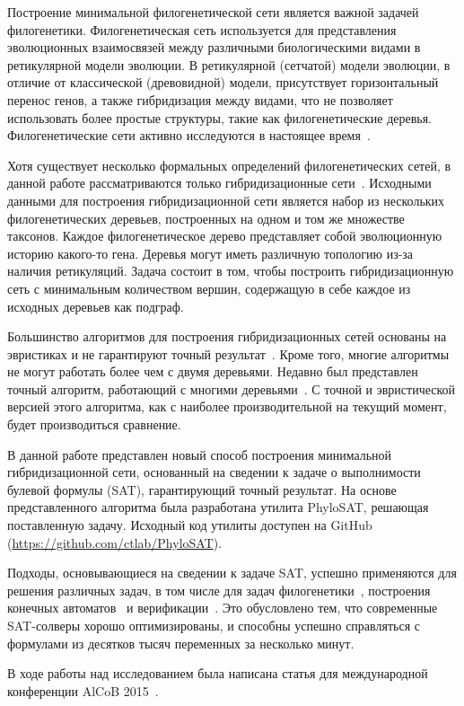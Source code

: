 \startprefacepage

Построение минимальной филогенетической сети является важной задачей филогенетики.
Филогенетическая сеть используется для представления эволюционных взаимосвязей между различными биологическими видами в ретикулярной модели эволюции.
В ретикулярной (сетчатой) модели эволюции, в отличие от классической (древовидной) модели, присутствует горизонтальный перенос генов, а также гибридизация между видами, что не позволяет использовать более простые структуры, такие как филогенетические деревья.
Филогенетические сети активно исследуются в настоящее время~\cite{huson2010phylogenetic, morrison2011introduction, 
nakhleh2011evolutionary}.

Хотя существует несколько формальных определений филогенетических сетей, в данной работе рассматриваются только гибридизационные сети~\cite{semple2006hybridization, chen2010hybridnet}.
Исходными данными для построения гибридизационной сети является набор из нескольких филогенетических деревьев, построенных на одном и том же множестве таксонов.
Каждое филогенетическое дерево представляет собой эволюционную историю какого-то гена.
Деревья могут иметь различную топологию из-за наличия ретикуляций.
Задача состоит в том, чтобы построить гибридизационную сеть с минимальным количеством вершин, содержащую в себе каждое из исходных деревьев как подграф.

Большинство алгоритмов для построения гибридизационных сетей основаны на эвристиках и не гарантируют точный результат~\cite{wu2010close, park2012murpar}.
Кроме того, многие алгоритмы не могут работать более чем с двумя деревьями.
Недавно был представлен точный алгоритм, работающий с многими деревьями~\cite{wu2013algorithm}.
С точной и эвристической версией этого алгоритма, как с наиболее производительной на текущий момент, будет производиться сравнение.

В данной работе представлен новый способ построения минимальной гибридизационной сети, основанный на сведении к задаче о выполнимости булевой формулы (SAT), гарантирующий точный результат.
На основе представленного алгоритма была разработана утилита PhyloSAT, решающая поставленную задачу. Исходный код утилиты доступен на GitHub (\url{https://github.com/ctlab/PhyloSAT}).

Подходы, основывающиеся на сведении к задаче SAT, успешно применяются для решения различных задач, в том числе для задач филогенетики~\cite{bonet2009efficiently}, построения конечных автоматов~\cite{heule2010exact} и верификации~\cite{biere2003bounded}.
Это обусловлено тем, что современные SAT-солверы хорошо оптимизированы, и способны успешно справляться с формулами из десятков тысяч переменных за несколько минут.

В ходе работы над исследованием была написана статья для международной конференции AlCoB 2015~\cite{ulyantsev2015constructing}.
